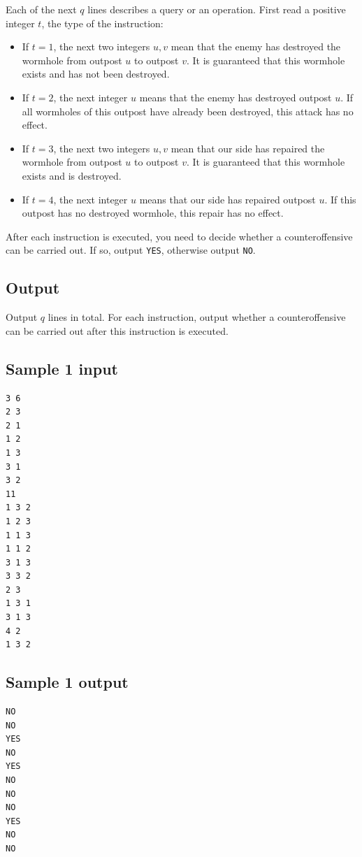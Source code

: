 \documentclass[11pt]{article}
\begin{document}
Each of the next $q$ lines describes a query or an operation.
First read a positive integer $t$, the type of the instruction:
\begin{itemize}
\item If $t = 1$, the next two integers $u, v$ mean that the enemy has
destroyed the wormhole from outpost $u$ to outpost $v$.
It is guaranteed that this wormhole exists and has not been destroyed.
\item If $t = 2$, the next integer $u$ means that the enemy has destroyed
outpost $u$.
If all wormholes of this outpost have already been destroyed,
this attack has no effect.
\item If $t = 3$, the next two integers $u, v$ mean that our side has
repaired the wormhole from outpost $u$ to outpost $v$.
It is guaranteed that this wormhole exists and is destroyed.
\item If $t = 4$, the next integer $u$ means that our side has repaired
outpost $u$.
If this outpost has no destroyed wormhole, this repair has no effect.
\end{itemize}
After each instruction is executed,
you need to decide whether a counteroffensive can be carried out.
If so, output \texttt{YES}, otherwise output \texttt{NO}.

\subsection*{Output}

Output $q$ lines in total.
For each instruction, output whether a counteroffensive can be carried
out after this instruction is executed.

\subsection*{Sample 1 input}

\begin{verbatim}
3 6
2 3
2 1
1 2
1 3
3 1
3 2
11
1 3 2
1 2 3
1 1 3
1 1 2
3 1 3
3 3 2
2 3
1 3 1
3 1 3
4 2
1 3 2
\end{verbatim}

\subsection*{Sample 1 output}

\begin{verbatim}
NO
NO
YES
NO
YES
NO
NO
NO
YES
NO
NO
\end{verbatim}
\end{document}
